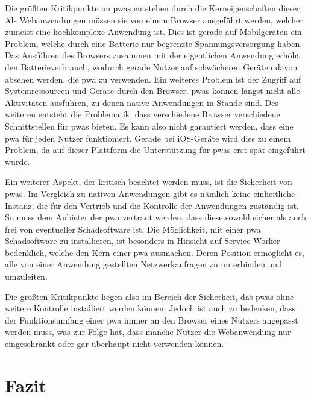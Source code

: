 \documentclass[12pt, parskip=half]{scrartcl}       %
\begin{document}
Die größten Kritikpunkte an \acp{pwa} entstehen durch die Kerneigenschaften dieser.
Als Webanwendungen müssen sie von einem Browser ausgeführt werden, welcher zumeist eine hochkomplexe Anwendung ist.
Dies ist gerade auf Mobilgeräten ein Problem, welche durch eine Batterie nur begrenzte Spannungsversorgung haben.
Das Ausführen des Browsers zusammen mit der eigentlichen Anwendung erhöht den Batterieverbrauch, wodurch gerade Nutzer auf schwächeren Geräten davon absehen werden, die \ac{pwa} zu verwenden.
Ein weiteres Problem ist der Zugriff auf Systemressourcen und Geräte durch den Browser.
\acp{pwa} können längst nicht alle Aktivitäten ausführen, zu denen native Anwendungen in Stande sind.
Des weiteren entsteht die Problematik, dass verschiedene Browser verschiedene Schnittstellen für \acp{pwa} bieten.
Es kann also nicht garantiert werden, dass eine \ac{pwa} für jeden Nutzer funktioniert.
Gerade bei iOS-Geräte wird dies zu einem Problem, da auf dieser Plattform die Unterstützung für \acp{pwa} erst spät eingeführt wurde.

Ein weiterer Aspekt, der kritisch beachtet werden muss, ist die Sicherheit von \acp{pwa}.
Im Vergleich zu nativen Anwendungen gibt es nämlich keine einheitliche Instanz, die für den Vertrieb und die Kontrolle der Anwendungen zuständig ist.
So muss dem Anbieter der \ac{pwa} vertraut werden, dass diese sowohl sicher als auch frei von eventueller Schadsoftware ist.
Die Möglichkeit, mit einer \ac{pwa} Schadsoftware zu installieren, ist besonders in Hinsicht auf Service Worker bedenklich, welche den Kern einer \ac{pwa} ausmachen.
Deren Position ermöglicht es, alle von einer Anwendung gestellten Netzwerkanfragen zu unterbinden und umzuleiten.

Die größten Kritikpunkte liegen also im Bereich der Sicherheit, das \acp{pwa} ohne weitere Kontrolle installiert werden können.
Jedoch ist auch zu bedenken, dass der Funktionsumfang einer \ac{pwa} immer an den Browser eines Nutzers angepasst werden muss, was zur Folge hat, dass manche Nutzer die Webanwendung nur eingeschränkt oder gar überhaupt nicht verwenden können.

\section{Fazit}



\newpage


\printbibliography
\end{document}
